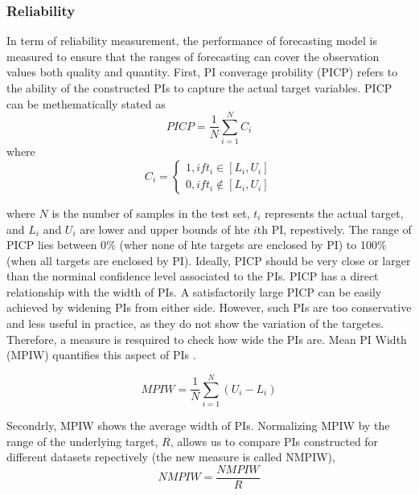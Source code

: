 \documentclass[review]{elsarticle}
\begin{document}
      \subsubsection{Reliability}
        In term of reliability measurement, the performance of forecasting model is measured to ensure that the ranges of forecasting can cover the observation values both quality and quantity.
        First,  PI converage probility (PICP) refers to the ability of the constructed PIs to capture the actual target variables. PICP can be methematically stated as
        \begin{equation}
          PICP = \frac{1}{N} \sum_{i=1}^{N} C_{i}
          \label{eq.PICP}
        \end{equation}
        where
        \begin{equation}
          C_{i} =
          \begin{cases}
            1, if t_{i} \in [L_{i},U_{i}] \\
            0, if t_{i} \not\in [L_{i},U_{i}]
          \end{cases}
          \label{eq.Ci}
        \end{equation}

        where $N$ is the number of samples in the test set, $t_{i}$ represents the actual target, and $L_{i}$ and $U_{i}$ are lower and upper bounds of hte $i$th PI, repestively. The range of PICP lies between 0$\%$ (wher none of hte targets are enclosed by PI) to 100$\%$ (when all targets are enclosed by PI). Ideally, PICP should be very close or larger than the norminal confidence level associated to the PIs.
        PICP has a direct relationship with the width of PIs. A satisfactorily large PICP can be easily achieved by widening PIs from either side. However, such PIs are too conservative and less useful in practice, as they do not show the variation of the targetes. Therefore, a measure is resquired to check how wide the PIs are. Mean PI Width (MPIW) quantifies this aspect of PIs \cite{Khosravi2010}.

        \begin{equation}
          MPIW = \frac{1}{N} \sum_{i=1}^{N} (U_{i}-L_{i})
          \label{eq.MPIW}
        \end{equation}

        Secondrly, MPIW shows the average width of PIs. Normalizing MPIW by the range of the underlying target, $R$, allows us to compare PIs constructed for different datasets repectively (the new measure is called NMPIW),
        \begin{equation}
          NMPIW = \frac{NMPIW}{R}
          \label{eq.NMPIW}
        \end{equation}
\end{document}
